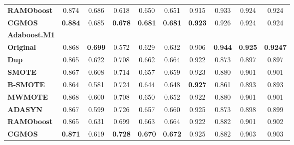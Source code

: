 \documentclass{iitthesis}
\begin{document}
\begin{table}[]
\begin{center}
{\begin{tabular}{lccccccccc}
\multicolumn{1}{l}{\textbf{RAMOboost}} & 0.874 & 0.686 & 0.618 & 0.650 & 0.651 & 0.915 & 0.933 & 0.924 & 0.924  \\ 
\multicolumn{1}{l}{\textbf{CGMOS}} & \textbf{0.884} & 0.685 & \textbf{0.678} & \textbf{0.681} & \textbf{0.681} & \textbf{0.923} & 0.926 & 0.924 & 0.924  \\ 
\hline                      
\multicolumn{1}{l}{\textbf{Adaboost.M1}} & & \multicolumn{4}{c}{} & \multicolumn{4}{c}{}  \\               
\hline                    
\multicolumn{1}{l}{\textbf{Original}} & 0.868 & \textbf{0.699} & 0.572 & 0.629 & 0.632 & 0.906 & \textbf{0.944} & \textbf{0.925} & \textbf{0.9247}  \\
\multicolumn{1}{l}{\textbf{Dup}} & 0.865 & 0.622 & 0.708 & 0.662 & 0.664 & 0.922 & 0.873 & 0.897 & 0.897  \\ 
\multicolumn{1}{l}{\textbf{SMOTE}} & 0.867 & 0.608 & 0.714 & 0.657 & 0.659 & 0.923 & 0.880 & 0.901 & 0.901  \\ 
\multicolumn{1}{l}{\textbf{B-SMOTE}} & 0.864 & 0.581 & 0.724 & 0.644 & 0.648 & \textbf{0.927} & 0.861 & 0.893 & 0.893  \\ 
\multicolumn{1}{l}{\textbf{MWMOTE}} & 0.868 & 0.600 & 0.708 & 0.650 & 0.652 & 0.922 & 0.880 & 0.901 & 0.901  \\ 
\multicolumn{1}{l}{\textbf{ADASYN}} & 0.867 & 0.599 & 0.726 & 0.657 & 0.660 & 0.925 & 0.873 & 0.898 & 0.899  \\ 
\multicolumn{1}{l}{\textbf{RAMOboost}} & 0.865 & 0.631 & 0.699 & 0.663 & 0.664 & 0.922 & 0.882 & 0.901 & 0.902  \\ 
\multicolumn{1}{l}{\textbf{CGMOS}} & \textbf{0.871} & 0.619 & \textbf{0.728} & \textbf{0.670} & \textbf{0.672} & 0.925 & 0.882 & 0.903 & 0.903  \\ 
\hline 
\end{tabular}
}
\end{center}
\label{tab: results_real_data}
\end{table}
 
\end{document}
